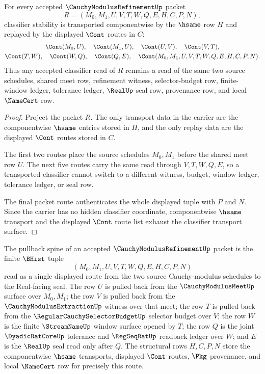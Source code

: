 \begin{theorem}
\label{thm:cauchy-modulus-refinement-classifier-transport}
For every accepted $\CauchyModulusRefinementUp$ packet
$$
R=(M_0,M_1,U,V,T,W,Q,E,H,C,P,N),
$$
classifier stability is transported componentwise by the $\hsame$ row $H$ and replayed by the displayed $\Cont$ routes in $C$:
$$
\begin{gathered}
\Cont(M_0,U),\quad \Cont(M_1,U),\quad \Cont(U,V),\quad \Cont(V,T),\\
\Cont(T,W),\quad \Cont(W,Q),\quad \Cont(Q,E),\quad
\Cont(M_0,M_1,U,V,T,W,Q,E,H,C,P,N).
\end{gathered}
$$
Thus any accepted classifier read of $R$ remains a read of the same two source schedules, shared meet row, refinement witness, selector-budget row, finite-window ledger, tolerance ledger, $\RealUp$ seal row, provenance row, and local $\NameCert$ row.
\end{theorem}
\begin{proof}
Project the packet $R$. The only transport data in the carrier are the componentwise $\hsame$ entries stored in $H$, and the only replay data are the displayed $\Cont$ routes stored in $C$.

The first two routes place the source schedules $M_0,M_1$ before the shared meet row $U$. The next five routes carry the same read through $V,T,W,Q,E$, so a transported classifier cannot switch to a different witness, budget, window ledger, tolerance ledger, or seal row.

The final packet route authenticates the whole displayed tuple with $P$ and $N$. Since the carrier has no hidden classifier coordinate, componentwise $\hsame$ transport and the displayed $\Cont$ route list exhaust the classifier transport surface.
\end{proof}

\begin{definition}
\label{def:cauchy-modulus-refinement-pullback-spine}
The pullback spine of an accepted $\CauchyModulusRefinementUp$ packet is the finite $\BHist$ tuple
$$
(M_0,M_1,U,V,T,W,Q,E,H,C,P,N)
$$
read as a single displayed route from the two source Cauchy-modulus schedules to the Real-facing seal. The row $U$ is pulled back from the $\CauchyModulusMeetUp$ surface over $M_0,M_1$; the row $V$ is pulled back from the $\CauchyModulusExtractionUp$ witness over that meet; the row $T$ is pulled back from the $\RegularCauchySelectorBudgetUp$ selector budget over $V$; the row $W$ is the finite $\StreamNameUp$ window surface opened by $T$; the row $Q$ is the joint $\DyadicRatCoreUp$ tolerance and $\RegSeqRatUp$ readback ledger over $W$; and $E$ is the $\RealUp$ seal read only after $Q$. The structural rows $H,C,P,N$ store the componentwise $\hsame$ transports, displayed $\Cont$ routes, $\Pkg$ provenance, and local $\NameCert$ row for precisely this route.
\end{definition}

